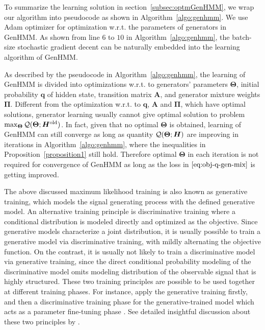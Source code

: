 To summarize the learning solution in section~\ref{subsec:optmGenHMM}, we wrap our algorithm into pseudocode as shown in Algorithm~\ref{algo:genhmm}. We use Adam \cite{DBLP:journals/corr/KingmaB14} optimizer for optimization w.r.t. the parameters of generators in GenHMM. As shown from line $6$ to $10$ in Algorithm~\ref{algo:genhmm}, the batch-size stochastic gradient decent can be naturally embedded into the learning algorithm of GenHMM.

As described by the pseudocode in Algorithm~\ref{algo:genhmm}, the learning of GenHMM is divided into optimizations w.r.t. to generators' parameters $\bm{\Theta}$, initial probability $\bm{q}$ of hidden state, transition matrix $\bm{A}$, and generator mixture weights $\bm{\Pi}$. Different from the optimization w.r.t. to $\bm{q}$, $\bm{A}$ and $\bm{\Pi}$, which have optimal solutions, generator learning usually cannot give optimal solution to problem $\max_{\bm{\Theta}} \mathcal{Q}(\bm{\Theta}; \bm{H}^{\mathrm{old}})$. In fact, given that no optimal $\bm{\Theta}$ is obtained, learning of GenHMM can still converge as long as quantity $\mathcal{Q}(\bm{\Theta}; \bm{H})$ are improving in iterations in Algorithm~\ref{algo:genhmm}, where the inequalities in Proposition~\ref{proposition1} still hold. Therefore optimal $\bm{\Theta}$ in each iteration is not required for convergence of GenHMM as long as the loss in $\eqref{eq:obj-q-gen-mix}$ is getting improved.
\begin{remark}
  \label{chpt7:rmk:generative-discriminative}
  {The above discussed maximum likelihood training is also known as generative training, which models the signal generating process with the defined generative model. An alternative training principle is discriminative training where a conditional distribution is modeled directly and optimized as the objective. Since generative models characterize a joint distribution, it is usually possible to train a generative model via discriminative training, with mildly alternating the objective function. On the contrast, it is usually not likely to train a discriminative model via generative training, since the direct conditional probability modeling of the discriminative model omits modeling distribution of the observable signal that is highly structured. These two training principles are possible to be used together at different training phases. For instance, apply the generative training firstly, and then a discriminative training phase for the generative-trained model which acts as a parameter fine-tuning phase \cite{hinton2012deepSpeech}. See detailed insightful discussion about these two principles by \cite{lasserre2006principled}.
  }
\end{remark}

